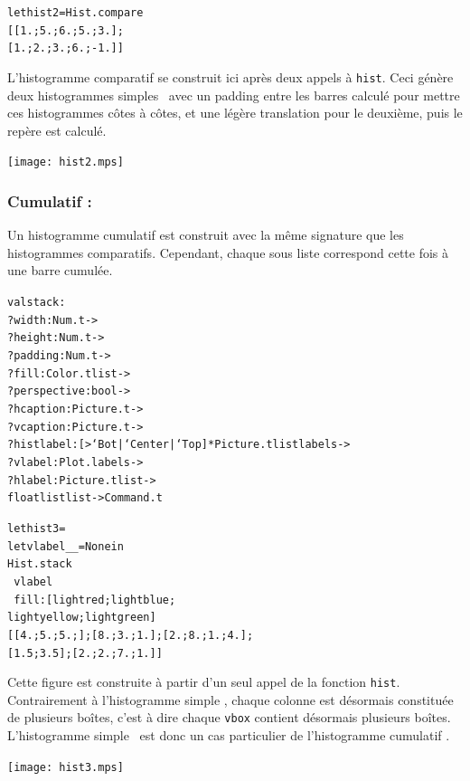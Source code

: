 \documentclass[a4paper,12pt]{article}
\begin{document}
\begin{minipage}{0.5\linewidth}
  \begin{alltt}
    let hist2 = Hist.compare
    [[1.;5.;6.;5.;3.];
      [1.;2.;3.;6.;-1.]]
  \end{alltt}
  
  L'histogramme comparatif se construit ici après deux appels à \texttt{hist}. Ceci génère deux histogrammes \og simples \fg\, avec un padding entre les barres calculé pour mettre ces histogrammes côtes à côtes, et une légère translation pour le deuxième, puis le repère est calculé.
\end{minipage}
\begin{minipage}{0.5\linewidth}
\begin{center}
\texttt{[image: hist2.mps]}
\end{center}
\end{minipage}

\subsubsection{Cumulatif :} 
Un histogramme cumulatif est construit avec la même signature que les histogrammes comparatifs. Cependant, chaque sous liste correspond cette fois à une barre cumulée.
\begin{alltt}
  val stack :
  ?width:Num.t ->
  ?height:Num.t ->
  ?padding:Num.t ->
  ?fill:Color.t list ->
  ?perspective: bool ->
  ?hcaption:Picture.t ->
  ?vcaption:Picture.t ->
  ?histlabel:[> `Bot | `Center | `Top ] * Picture.t list labels ->
  ?vlabel:Plot.labels ->
  ?hlabel:Picture.t list -> 
  float list list -> Command.t
\end{alltt}

\bigskip

\begin{minipage}{0.5\linewidth}
  \begin{alltt}
    let hist3 =
    let vlabel _ _ = None in
    Hist.stack 
    ~vlabel
    ~fill:[lightred;lightblue;
      lightyellow;lightgreen]
    [[4.;5.;5.;]; [8.;3.;1.]; [2.;8.;1.;4.];
      [1.5;3.5];[2.;2.;7.;1.]]
  \end{alltt}
  
  Cette figure est construite à partir d'un seul appel de la fonction \texttt{hist}. Contrairement à l'histogramme \og simple \fg, chaque colonne est désormais constituée de plusieurs boîtes, c'est à dire chaque \texttt{vbox} contient désormais plusieurs boîtes. L'histogramme \og simple \fg\ est donc un cas particulier de l'histogramme \og cumulatif \fg.
\end{minipage}
\begin{minipage}{0.5\linewidth}
\begin{center}
\texttt{[image: hist3.mps]}
\end{center}
\end{minipage}
\end{document}
